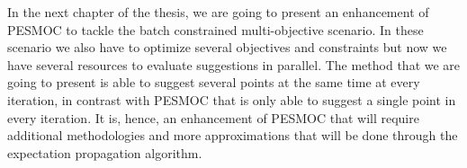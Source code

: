 In the next chapter of the thesis, we are going to present an enhancement of PESMOC to tackle the batch constrained multi-objective scenario. In these scenario we also have to optimize several objectives and constraints but now we have several resources to evaluate suggestions in parallel. The method that we are going to present is able to suggest several points at the same time at every iteration, in contrast with PESMOC that is only able to suggest a single point in every iteration. It is, hence, an enhancement of PESMOC that will require additional methodologies and more approximations that will be done through the expectation propagation algorithm.
